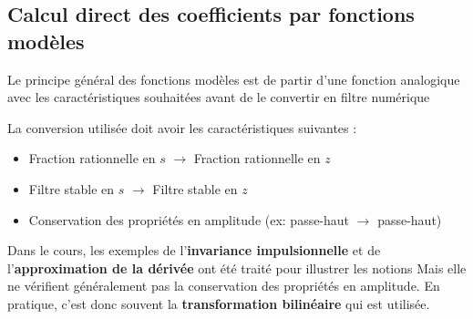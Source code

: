 \documentclass[11pt,a4paper]{article}
\begin{document}
\subsection{Calcul direct des coefficients par fonctions modèles}
Le principe général des fonctions modèles est de partir d'une fonction analogique avec les caractéristiques souhaitées  avant de le convertir en filtre numérique

\begin{center}
\end{center}

La conversion utilisée doit avoir les caractéristiques suivantes : 
\begin{itemize}
\item Fraction rationnelle en $s$ $\rightarrow$ Fraction rationnelle en $z$

\item Filtre stable en  $s$ $\rightarrow$ Filtre stable en  $z$

\item Conservation des propriétés en amplitude (ex: passe-haut $\rightarrow$ passe-haut)
\end{itemize}

Dans le cours, les exemples de l'\textbf{invariance impulsionnelle} et de l'\textbf{approximation de la dérivée} ont été traité pour illustrer les notions Mais elle ne vérifient généralement pas la conservation des propriétés en amplitude. En pratique, c'est donc souvent la \textbf{transformation bilinéaire} qui est utilisée.
\end{document}
